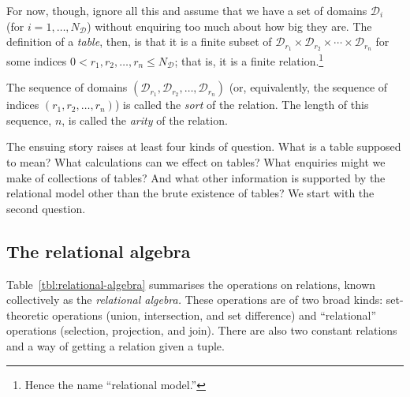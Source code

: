 \documentclass[10pt, a4paper, twocolumn]{article}
\begin{document}
For now, though, ignore all this and assume that we have a set of domains
$\mathscr{D}_i$ (for $i=1,\dotsc, N_\mathscr{D}$) without enquiring too much
about how big they are. The definition of a \emph{table}, then, is that it is a
finite subset of $\mathscr{D}_{r_1}\times \mathscr{D}_{r_2}\times\dotsm\times\mathscr{D}_{r_n}$
for some indices $0 < r_1, r_2, \dots, r_n \leq N_\mathscr{D}$; that is, it is a
finite relation.\footnote{Hence the name ``relational model.''}

The sequence of domains $(\mathscr{D}_{r_1}, \mathscr{D}_{r_2}, \dotsc,
\mathscr{D}_{r_n})$ (or, equivalently, the sequence of indices $(r_1, r_2,
\dotsc, r_n)$) is called the \emph{sort} of the relation. The length of this
  sequence, $n$, is called the \emph{arity} of the relation. 

The ensuing story raises at least four kinds of question. What is a table
supposed to mean? What calculations can we effect on tables? What enquiries
might we make of collections of tables? And what other information is supported
by the relational model other than the brute existence of tables? We start with
the second question.

\subsection{The relational algebra}

Table~\ref{tbl:relational-algebra} summarises the operations on relations, known
collectively as the \emph{relational algebra.} These operations are of two broad
kinds: set-theoretic operations (union, intersection, and set difference) and
``relational'' operations (selection, projection, and join). There are also two
constant relations and a way of getting a relation given a tuple.
\end{document}
